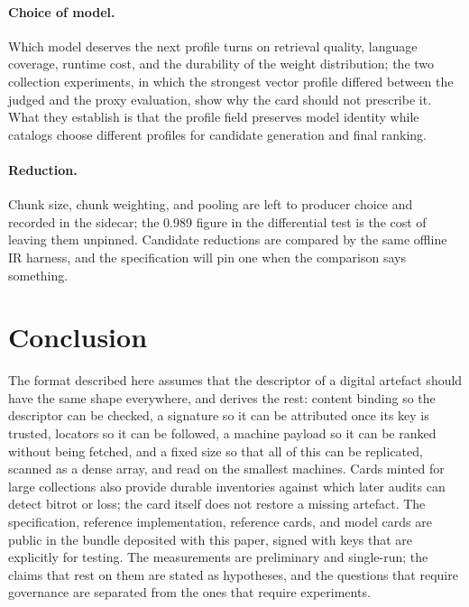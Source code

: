 \documentclass[sigconf]{acmart}
\begin{document}
\paragraph{Choice of model.} Which model deserves the next profile turns on
retrieval quality, language coverage, runtime cost, and the durability of the
weight distribution; the two collection experiments, in which the strongest
vector profile differed between the judged and the proxy evaluation, show
why the card should not prescribe it. What they establish is that the profile
field preserves model identity while catalogs choose different profiles for
candidate generation and final ranking.

\paragraph{Reduction.} Chunk size, chunk weighting, and pooling are left to
producer choice and recorded in the sidecar; the 0.989 figure in the
differential test is the cost of leaving them unpinned. Candidate reductions
are compared by the same offline IR harness, and the specification will pin
one when the comparison says something.

\section{Conclusion}

The format described here assumes that the descriptor of a digital artefact
should have the same shape everywhere, and derives the rest: content binding
so the descriptor can be checked, a signature so it can be attributed once
its key is trusted, locators so it can be followed, a machine payload so it
can be ranked without being fetched, and a fixed size so that all of this can
be replicated, scanned as a dense array, and read on the smallest machines.
Cards minted for large collections also provide durable inventories against
which later audits can detect bitrot or loss; the card itself does not
restore a missing artefact. The specification, reference implementation,
reference cards, and model cards are public in the bundle deposited with this
paper, signed with keys that are explicitly for testing. The measurements are
preliminary and single-run; the claims that rest on them are stated as
hypotheses, and the questions that require governance are separated from the
ones that require experiments.
\end{document}
